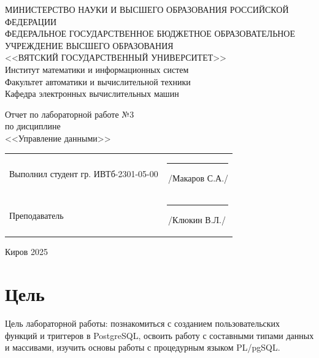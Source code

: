 \documentclass[a4paper,14pt]{extarticle}
\begin{document}
  \newpage\thispagestyle{empty}
  \begin{center}
    \MakeUppercase{
      Министерство науки и высшего образования Российской Федерации\\
      Федеральное государственное бюджетное образовательное учреждение высшего образования\\
      <<Вятский Государственный Университет>>\\
    }
    Институт математики и информационных систем\\
    Факультет автоматики и вычислительной техники\\
    Кафедра электронных вычислительных машин
  \end{center}
  \vfill

  \begin{center}
    Отчет по лабораторной работе №3\\
    по дисциплине\\
    <<Управление данными>>\\
  \end{center}
  \vfill

  \noindent
  \begin{tabular}{ll}
    Выполнил студент гр. ИВТб-2301-05-00 \hspace{5mm} &
    \rule[-1mm]{25mm}{0.10mm}\,/Макаров С.А./\\
    
    Преподаватель & \rule[-1mm]{25mm}{0.10mm}\,/Клюкин В.Л./\\
  \end{tabular}

  \vfill
  \begin{center}
    Киров 2025
  \end{center}

  \newpage
  \section*{Цель}
  Цель лабораторной работы: познакомиться с созданием пользовательских функций и триггеров в PostgreSQL, освоить работу с составными типами данных и массивами, изучить основы работы с процедурным языком PL/pgSQL.
\end{document}
